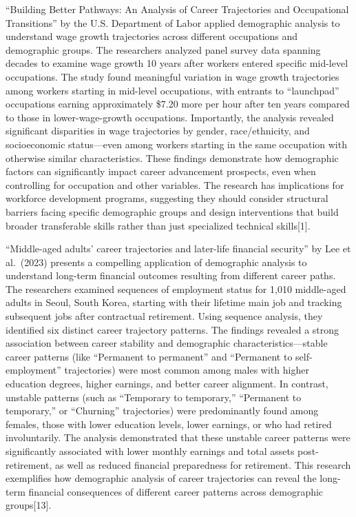 \documentclass[
  letterpaper,
  DIV=11,
  numbers=noendperiod]{scrartcl}
\begin{document}
``Building Better Pathways: An Analysis of Career Trajectories and
Occupational Transitions'' by the U.S. Department of Labor applied
demographic analysis to understand wage growth trajectories across
different occupations and demographic groups. The researchers analyzed
panel survey data spanning decades to examine wage growth 10 years after
workers entered specific mid-level occupations. The study found
meaningful variation in wage growth trajectories among workers starting
in mid-level occupations, with entrants to ``launchpad'' occupations
earning approximately \$7.20 more per hour after ten years compared to
those in lower-wage-growth occupations. Importantly, the analysis
revealed significant disparities in wage trajectories by gender,
race/ethnicity, and socioeconomic status---even among workers starting
in the same occupation with otherwise similar characteristics. These
findings demonstrate how demographic factors can significantly impact
career advancement prospects, even when controlling for occupation and
other variables. The research has implications for workforce development
programs, suggesting they should consider structural barriers facing
specific demographic groups and design interventions that build broader
transferable skills rather than just specialized technical
skills{[}1{]}.

``Middle-aged adults' career trajectories and later-life financial
security'' by Lee et al.~(2023) presents a compelling application of
demographic analysis to understand long-term financial outcomes
resulting from different career paths. The researchers examined
sequences of employment status for 1,010 middle-aged adults in Seoul,
South Korea, starting with their lifetime main job and tracking
subsequent jobs after contractual retirement. Using sequence analysis,
they identified six distinct career trajectory patterns. The findings
revealed a strong association between career stability and demographic
characteristics---stable career patterns (like ``Permanent to
permanent'' and ``Permanent to self-employment'' trajectories) were most
common among males with higher education degrees, higher earnings, and
better career alignment. In contrast, unstable patterns (such as
``Temporary to temporary,'' ``Permanent to temporary,'' or ``Churning''
trajectories) were predominantly found among females, those with lower
education levels, lower earnings, or who had retired involuntarily. The
analysis demonstrated that these unstable career patterns were
significantly associated with lower monthly earnings and total assets
post-retirement, as well as reduced financial preparedness for
retirement. This research exemplifies how demographic analysis of career
trajectories can reveal the long-term financial consequences of
different career patterns across demographic groups{[}13{]}.
\end{document}
